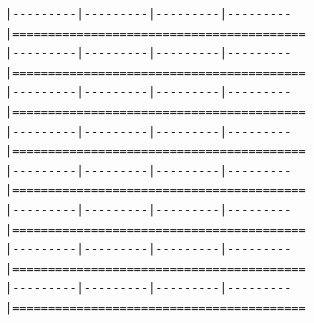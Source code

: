 \documentclass[
]{article}
\begin{document}
\begin{verbatim}
|---------|---------|---------|---------|=========================================                                          |---------|---------|---------|---------|=========================================                                          |---------|---------|---------|---------|=========================================                                          |---------|---------|---------|---------|=========================================                                          |---------|---------|---------|---------|=========================================                                          |---------|---------|---------|---------|=========================================                                          |---------|---------|---------|---------|=========================================                                          |---------|---------|---------|---------|=========================================                                          
\end{verbatim}
\end{document}
